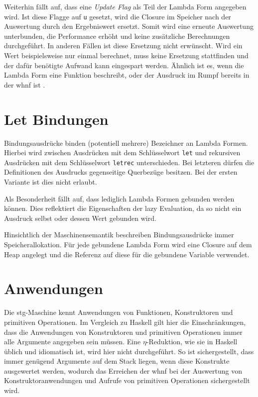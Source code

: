 Weiterhin fällt auf, dass eine \textit{Update Flag} als Teil der Lambda Form angegeben wird.
Ist diese Flagge auf \texttt{u} gesetzt, wird die Closure im Speicher nach der Auswertung durch den Ergebniswert ersetzt.
Somit wird eine erneute Auswertung unterbunden, die Performance erhöht und keine zusätzliche Berechnungen durchgeführt.
In anderen Fällen ist diese Ersetzung nicht erwünscht.
Wird ein Wert beispielsweise nur einmal berechnet, muss keine Ersetzung stattfinden und der dafür benötigte Aufwand kann eingespart werden.
Ähnlich ist es, wenn die Lambda Form eine Funktion beschreibt, oder der Ausdruck im Rumpf bereits in der \gls{whnf} ist .


\section{Let Bindungen}

Bindungsausdrücke binden (potentiell mehrere) Bezeichner an Lambda Formen.
Hierbei wird zwischen Ausdrücken mit dem Schlüsselwort \texttt{let} und rekursiven Ausdrücken mit dem Schlüsselwort \texttt{letrec} unterschieden.
Bei letzteren dürfen die Definitionen des Ausdrucks gegenseitige Querbezüge besitzen.
Bei der ersten Variante ist dies nicht erlaubt.

Als Besonderheit fällt auf, dass lediglich Lambda Formen gebunden werden können.
Dies reflektiert die Eigenschaften der lazy Evaluation, da so nicht ein Ausdruck selbst oder dessen Wert gebunden wird.

Hinsichtlich der Maschinensemantik beschreiben Bindungsausdrücke immer Speicherallokation.
Für jede gebundene Lambda Form wird eine Closure auf dem Heap angelegt und die Referenz auf diese für die gebundene Variable verwendet.


\section{Anwendungen}

Die \gls{stg}-Maschine kennt Anwendungen von Funktionen, Konstruktoren und primitiven Operationen.
Im Vergleich zu Haskell gilt hier die Einschränkungen, dass die Anwendungen von Konstruktoren und primitiven Operationen immer alle Argumente angegeben sein müssen.
Eine $\eta$-Reduktion, wie sie in Haskell üblich und idiomatisch ist, wird hier nicht durchgeführt.
So ist sichergestellt, dass immer genügend Argumente auf dem Stack liegen, wenn diese Konstrukte ausgewertet werden, wodurch das Erreichen der \gls{whnf} bei der Auswertung von Konstruktoranwendungen und Aufrufe von primitiven Operationen sichergestellt wird.

